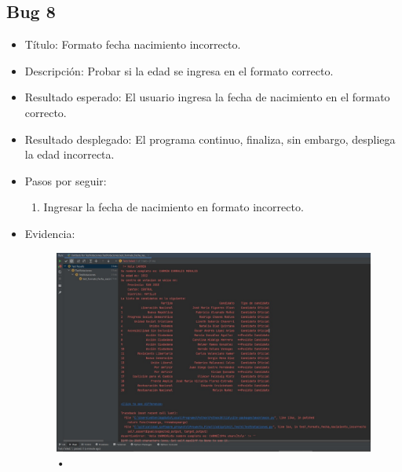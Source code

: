 \documentclass[conference]{IEEEtran}
\begin{document}
\subsection*{Bug 8}
\begin{itemize}
\item Título: Formato fecha nacimiento incorrecto.

\item Descripción: Probar si la edad se ingresa en el formato correcto.

\item Resultado esperado: El usuario ingresa la fecha de nacimiento en el formato correcto.

\item Resultado desplegado: El programa continuo, finaliza, sin embargo, despliega la edad incorrecta.

\item Pasos por seguir: 
\begin{enumerate}
\item Ingresar la fecha de nacimiento en formato incorrecto.
\end{enumerate}
\item Evidencia:

\begin{figure}[H]
\centering
\includegraphics[scale=0.2]{imagenes/fecha_formato_incorrecto.jpeg}
\caption{•}
\end{figure}

\end{itemize}
\end{document}
